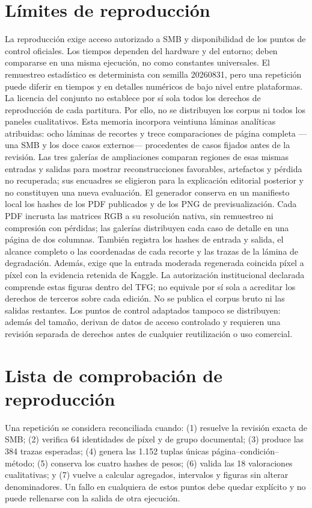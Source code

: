 \section{Límites de reproducción}
La reproducción exige acceso autorizado a SMB y disponibilidad de los puntos de control oficiales.
Los tiempos dependen del hardware y del entorno; deben compararse en una misma ejecución, no como
constantes universales. El remuestreo estadístico es determinista con semilla 20260831, pero una
repetición puede diferir en tiempos y en detalles numéricos de bajo nivel entre plataformas. La
licencia del conjunto no establece por sí sola todos los derechos de reproducción de cada
partitura. Por ello, no se distribuyen los corpus ni todos los paneles cualitativos. Esta memoria
incorpora veintiuna láminas analíticas atribuidas: ocho láminas de recortes y trece comparaciones de
página completa ---una SMB y los doce casos externos--- procedentes de casos fijados antes de la
revisión. Las tres galerías de ampliaciones comparan regiones de esas mismas entradas y salidas
para mostrar reconstrucciones favorables, artefactos y pérdida no recuperada; sus encuadres se
eligieron para la explicación editorial posterior y no constituyen una nueva evaluación.
El generador conserva en un manifiesto local los hashes de
los PDF publicados y de los PNG de previsualización. Cada PDF incrusta las matrices RGB a su
resolución nativa, sin remuestreo ni compresión con pérdidas; las galerías distribuyen cada caso
de detalle en una página de dos columnas. También registra los hashes de
entrada y salida, el alcance completo o las coordenadas de cada recorte y las trazas de la lámina
de degradación. Además, exige que la entrada moderada regenerada coincida píxel a píxel con la
evidencia retenida de Kaggle. La autorización institucional declarada comprende estas figuras
dentro del TFG; no equivale por sí sola a acreditar los derechos de terceros sobre cada edición.
No se publica el corpus bruto ni las salidas restantes.
Los puntos de control adaptados tampoco se distribuyen: además del tamaño, derivan de datos de
acceso controlado y requieren una revisión separada de derechos antes de cualquier reutilización o
uso comercial.

\section{Lista de comprobación de reproducción}
Una repetición se considera reconciliada cuando: (1) resuelve la revisión exacta de SMB; (2)
verifica 64 identidades de píxel y de grupo documental; (3) produce las 384 trazas esperadas; (4) genera las
1.152 tuplas únicas página--condición--método; (5) conserva los cuatro hashes de pesos; (6) valida
las 18 valoraciones cualitativas; y (7) vuelve a calcular agregados, intervalos y figuras sin
alterar denominadores. Un fallo en cualquiera de estos puntos debe quedar explícito y no puede
rellenarse con la salida de otra ejecución.

